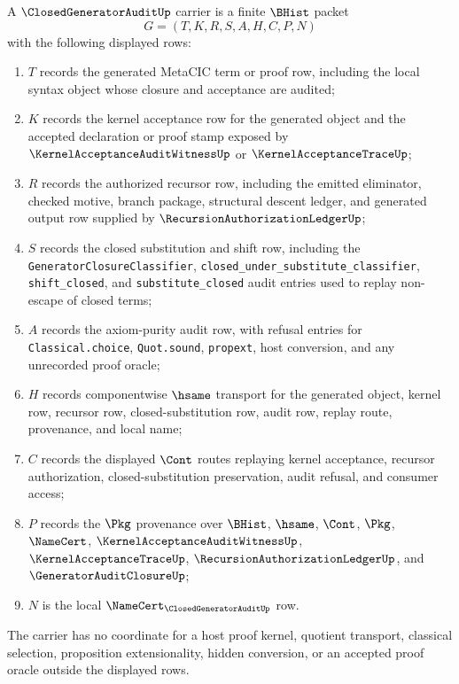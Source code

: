 \begin{definition}
\label{def:closed-generator-audit-carrier}
A $\ClosedGeneratorAuditUp$ carrier is a finite $\BHist$ packet
$$
G=(T,K,R,S,A,H,C,P,N)
$$
with the following displayed rows:
\begin{enumerate}
\item $T$ records the generated MetaCIC term or proof row, including the local syntax object whose closure and acceptance are audited;
\item $K$ records the kernel acceptance row for the generated object and the accepted declaration or proof stamp exposed by $\KernelAcceptanceAuditWitnessUp$ or $\KernelAcceptanceTraceUp$;
\item $R$ records the authorized recursor row, including the emitted eliminator, checked motive, branch package, structural descent ledger, and generated output row supplied by $\RecursionAuthorizationLedgerUp$;
\item $S$ records the closed substitution and shift row, including the \texttt{GeneratorClosureClassifier}, \texttt{closed\_under\_substitute\_classifier}, \texttt{shift\_closed}, and \texttt{substitute\_closed} audit entries used to replay non-escape of closed terms;
\item $A$ records the axiom-purity audit row, with refusal entries for \texttt{Classical.choice}, \texttt{Quot.sound}, \texttt{propext}, host conversion, and any unrecorded proof oracle;
\item $H$ records componentwise $\hsame$ transport for the generated object, kernel row, recursor row, closed-substitution row, audit row, replay route, provenance, and local name;
\item $C$ records the displayed $\Cont$ routes replaying kernel acceptance, recursor authorization, closed-substitution preservation, audit refusal, and consumer access;
\item $P$ records the $\Pkg$ provenance over $\BHist$, $\hsame$, $\Cont$, $\Pkg$, $\NameCert$, $\KernelAcceptanceAuditWitnessUp$, $\KernelAcceptanceTraceUp$, $\RecursionAuthorizationLedgerUp$, and $\GeneratorAuditClosureUp$;
\item $N$ is the local $\NameCert_{\ClosedGeneratorAuditUp}$ row.
\end{enumerate}
The carrier has no coordinate for a host proof kernel, quotient transport, classical selection, proposition extensionality, hidden conversion, or an accepted proof oracle outside the displayed rows.
\end{definition}

